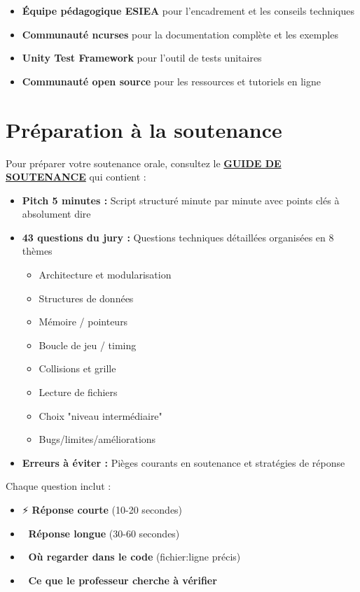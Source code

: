 \documentclass[12pt,a4paper]{article}
\begin{document}
\begin{itemize}
    \item \textbf{Équipe pédagogique ESIEA} pour l'encadrement et les conseils techniques
    \item \textbf{Communauté ncurses} pour la documentation complète et les exemples
    \item \textbf{Unity Test Framework} pour l'outil de tests unitaires
    \item \textbf{Communauté open source} pour les ressources et tutoriels en ligne
\end{itemize}


\section{Préparation à la soutenance}

Pour préparer votre soutenance orale, consultez le \textbf{\href{./SOUTENANCE.md}{GUIDE DE SOUTENANCE}} qui contient :

\begin{itemize}
    \item \textbf{Pitch 5 minutes :} Script structuré minute par minute avec points clés à absolument dire
    \item \textbf{43 questions du jury :} Questions techniques détaillées organisées en 8 thèmes
    \begin{itemize}
        \item Architecture et modularisation
        \item Structures de données
        \item Mémoire / pointeurs
        \item Boucle de jeu / timing
        \item Collisions et grille
        \item Lecture de fichiers
        \item Choix "niveau intermédiaire"
        \item Bugs/limites/améliorations
    \end{itemize}
    \item \textbf{Erreurs à éviter :} Pièges courants en soutenance et stratégies de réponse
\end{itemize}

Chaque question inclut :
\begin{itemize}
    \item ⚡ \textbf{Réponse courte} (10-20 secondes)
    \item 📖 \textbf{Réponse longue} (30-60 secondes)
    \item 📂 \textbf{Où regarder dans le code} (fichier:ligne précis)
    \item 🎯 \textbf{Ce que le professeur cherche à vérifier}
\end{itemize}
\end{document}

